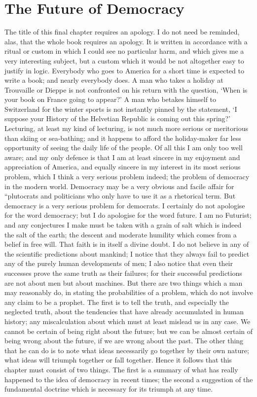 \documentclass{book}
\begin{document}
\chapter{The Future of Democracy}
\label{chapter-18}
The title of this final chapter requires an apology. I do not need be reminded, alas, that the whole book requires an apology. It is written in accordance with a ritual or custom in which I could see no particular harm, and which gives me a very interesting subject, but a custom which it would be not altogether easy to justify in logic. Everybody who goes to America for a short time is expected to write a book; and nearly everybody does. A man who takes a holiday at Trouvaille or Dieppe is not confronted on his return with the question, ‘When is your book on France going to appear?’ A man who betakes himself to Switzerland for the winter sports is not instantly pinned by the statement, ‘I suppose your History of the Helvetian Republic is coming out this spring?’ Lecturing, at least my kind of lecturing, is not much more serious or meritorious than skiing or sea-bathing; and it happens to afford the holiday-maker far less opportunity of seeing the daily life of the people. Of all this I am only too well aware; and my only defence is that I am at least sincere in my enjoyment and appreciation of America, and equally sincere in my interest in its most serious problem, which I think a very serious problem indeed; the problem of democracy in the modern world. Democracy may be a very obvious and facile affair for “plutocrats and politicians who only have to use it as a rhetorical term. But democracy is a very serious problem for democrats. I certainly do not apologise for the word democracy; but I do apologise for the word future. I am no Futurist; and any conjectures I make must be taken with a grain of salt which is indeed the salt of the earth; the descent and moderate humility which comes from a belief in free will. That faith is in itself a divine doubt. I do not believe in any of the scientific predictions about mankind; I notice that they always fail to predict any of the purely human developments of men; I also notice that even their successes prove the same truth as their failures; for their successful predictions are not about men but about machines. But there are two things which a man may reasonably do, in stating the probabilities of a problem, which do not involve any claim to be a prophet. The first is to tell the truth, and especially the neglected truth, about the tendencies that have already accumulated in human history; any miscalculation about which must at least mislead us in any case. We cannot be certain of being right about the future; but we can be almost certain of being wrong about the future, if we are wrong about the past. The other thing that he can do is to note what ideas necessarily go together by their own nature; what ideas will triumph together or fall together. Hence it follows that this chapter must consist of two things. The first is a summary of what has really happened to the idea of democracy in recent times; the second a suggestion of the fundamental doctrine which is necessary for its triumph at any time.
\end{document}
